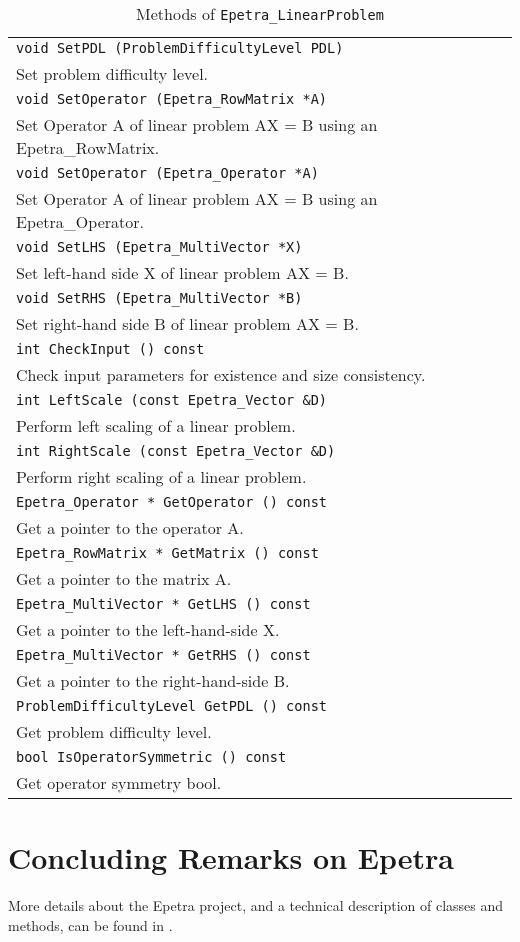\begin{table}
\begin{center}
\begin{tabular}{ | p{15cm} | }
\hline
\tt void 
SetPDL (ProblemDifficultyLevel PDL) \\
Set problem difficulty level.  \\
\tt void 
SetOperator (Epetra\_RowMatrix *A) \\
Set Operator A of linear problem AX = B using an Epetra\_RowMatrix.  \\
\tt void 
SetOperator (Epetra\_Operator *A) \\
Set Operator A of linear problem AX = B using an Epetra\_Operator.  \\
\tt void 
SetLHS (Epetra\_MultiVector *X) \\
Set left-hand side X of linear problem AX = B. \\
\tt void 
SetRHS (Epetra\_MultiVector *B) \\
Set right-hand side B of linear problem AX = B.  \\
\tt int 
CheckInput () const \\
Check input parameters for existence and size consistency. \\
\tt int  
LeftScale (const Epetra\_Vector \&D) \\
Perform left scaling of a linear problem.  \\
\tt int 
RightScale (const Epetra\_Vector \&D) \\
Perform right scaling of a linear problem. \\
\tt Epetra\_Operator * 
GetOperator () const\\
Get a pointer to the operator A. \\
\tt Epetra\_RowMatrix * 
GetMatrix () const \\
Get a pointer to the matrix A. \\
\tt Epetra\_MultiVector * 
GetLHS () const \\
Get a pointer to the left-hand-side X. \\
\tt Epetra\_MultiVector * 
GetRHS () const \\
Get a pointer to the right-hand-side B. \\
\tt ProblemDifficultyLevel 
GetPDL () const \\
Get problem difficulty level. \\
\tt bool 
IsOperatorSymmetric () const \\
Get operator symmetry bool. \\
\hline
\end{tabular}
\caption{Methods of {\tt Epetra\_LinearProblem}}
\label{tab:linear_sys}
\end{center}
\end{table}






\section{Concluding Remarks on Epetra}
\label{sec:epetra_concluding}

More details about the Epetra project, and a technical description of
classes and methods, can be found in
\cite{Epetra-Ref-Guide-new}.


